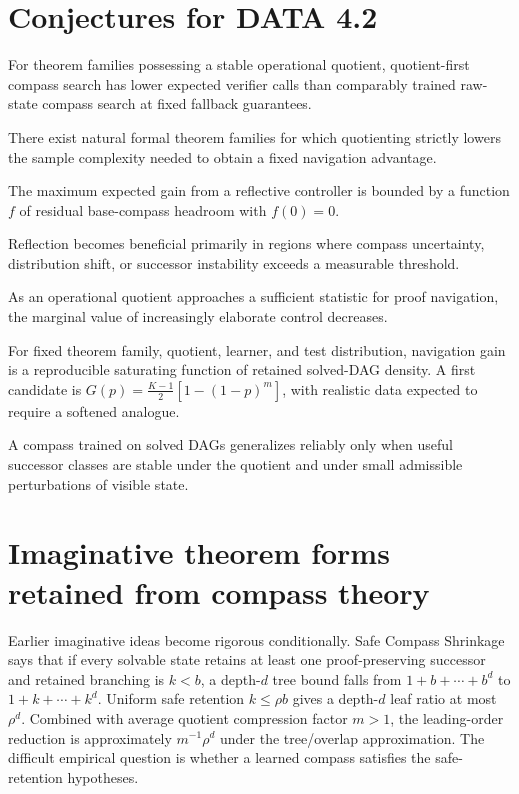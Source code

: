 \documentclass[11pt]{article}
\begin{document}
\section{Conjectures for DATA 4.2}
\begin{conjecture}For theorem families possessing a stable operational quotient, quotient-first compass search has lower expected verifier calls than comparably trained raw-state compass search at fixed fallback guarantees.\end{conjecture}
\begin{conjecture}There exist natural formal theorem families for which quotienting strictly lowers the sample complexity needed to obtain a fixed navigation advantage.\end{conjecture}
\begin{conjecture}The maximum expected gain from a reflective controller is bounded by a function $f$ of residual base-compass headroom with $f(0)=0$.\end{conjecture}
\begin{conjecture}Reflection becomes beneficial primarily in regions where compass uncertainty, distribution shift, or successor instability exceeds a measurable threshold.\end{conjecture}
\begin{conjecture}As an operational quotient approaches a sufficient statistic for proof navigation, the marginal value of increasingly elaborate control decreases.\end{conjecture}
\begin{conjecture}For fixed theorem family, quotient, learner, and test distribution, navigation gain is a reproducible saturating function of retained solved-DAG density. A first candidate is $G(p)=\frac{K-1}{2}[1-(1-p)^m]$, with realistic data expected to require a softened analogue.\end{conjecture}
\begin{conjecture}A compass trained on solved DAGs generalizes reliably only when useful successor classes are stable under the quotient and under small admissible perturbations of visible state.\end{conjecture}
\section{Imaginative theorem forms retained from compass theory}
Earlier imaginative ideas become rigorous conditionally. Safe Compass Shrinkage says that if every solvable state retains at least one proof-preserving successor and retained branching is $k<b$, a depth-$d$ tree bound falls from $1+b+\cdots+b^d$ to $1+k+\cdots+k^d$. Uniform safe retention $k\le\rho b$ gives a depth-$d$ leaf ratio at most $\rho^d$. Combined with average quotient compression factor $m>1$, the leading-order reduction is approximately $m^{-1}\rho^d$ under the tree/overlap approximation. The difficult empirical question is whether a learned compass satisfies the safe-retention hypotheses.
\end{document}
